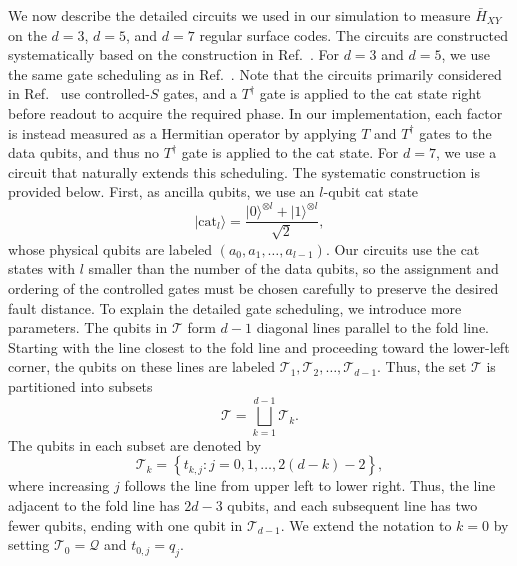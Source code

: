 \documentclass[
 reprint,
 amsmath,amssymb,
 pra,superscriptaddress, nofootinbib
]{revtex4-2}
\theoremstyle{definition}
\theoremstyle{plain}
\begin{document}
We now describe the detailed circuits we used in our simulation to measure $\bar{H}_{XY}$ on the $d=3$, $d=5$, and $d=7$ regular surface codes.
The circuits are constructed systematically based on the construction in Ref.~\cite{gpvl-lg4c}. For $d=3$ and $d=5$, we use the same gate scheduling as in Ref.~\cite{gpvl-lg4c}. 
Note that the circuits primarily considered in Ref.~\cite{gpvl-lg4c} use controlled-$S$ gates, and a $T^\dagger$ gate is applied to the cat state right before readout to acquire the required phase. In our implementation, each factor is instead measured as a Hermitian operator by applying $T$ and $T^\dagger$ gates to the data qubits, and thus no $T^\dagger$ gate is applied to the cat state.
For $d=7$, we use a circuit that naturally extends this scheduling. 
The systematic construction is provided below.
First, as ancilla qubits, we use an $l$-qubit cat state
\begin{equation}
    \lvert \mathrm{cat}_{l}\rangle
    =\frac{\lvert0\rangle^{\otimes l}+\lvert1\rangle^{\otimes l}}{\sqrt{2}},
\end{equation}
whose physical qubits are labeled $(a_0,a_1,\ldots,a_{l-1})$. 
Our circuits use the cat states with $l$ smaller than the number of the data qubits, so the assignment and ordering of the controlled gates must be chosen carefully to preserve the desired fault distance. 
To explain the detailed gate scheduling, we introduce more parameters. The qubits in $\mathcal{T}$ form $d-1$ diagonal lines parallel to the fold line.  Starting with the line closest to the fold line and proceeding toward the lower-left corner, the qubits on these lines are labeled $\mathcal{T}_1,\mathcal{T}_2,\ldots,\mathcal{T}_{d-1}$.  Thus, the set $\mathcal{T}$ is partitioned into subsets
\begin{equation}
    \mathcal{T}=\bigsqcup_{k=1}^{d-1}\mathcal{T}_k.
    \label{eq:half-lattice-partition}
\end{equation}
The qubits in each subset are denoted by
\begin{equation}
    \mathcal{T}_k
    =\left\{t_{k,j}:j=0,1,\ldots,2(d-k)-2\right\},
\end{equation}
where increasing $j$ follows the line from upper left to lower right.  Thus, the line adjacent to the fold line has $2d-3$ qubits, and each subsequent line has two fewer qubits, ending with one qubit in $\mathcal{T}_{d-1}$. We extend the notation to $k=0$ by setting $\mathcal{T}_0=\mathcal{Q}$ and $t_{0,j}=q_j$.
\end{document}
